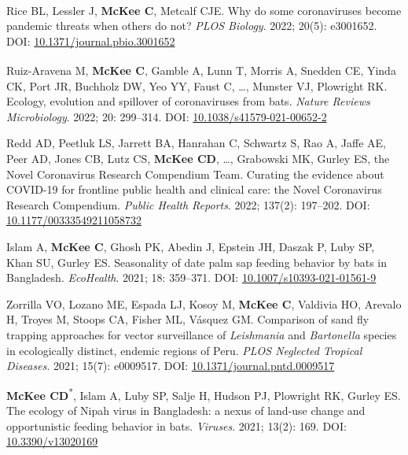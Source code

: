 \documentclass{cv}
\begin{document}
\begin{pubenum}
\item Rice BL\textsuperscript{\dag}, Lessler J\textsuperscript{\dag}, \textbf{McKee C}\textsuperscript{\dag}, Metcalf CJE\textsuperscript{\dag}. Why do some coronaviruses become pandemic threats when others do not? \textit{PLOS Biology}. 2022; 20(5): e3001652. DOI: \href{https://doi.org/10.1371/journal.pbio.3001652}{10.1371/journal.pbio.3001652}

\item Ruiz-Aravena M\textsuperscript{\dag}, \textbf{McKee C}\textsuperscript{\dag}, Gamble A, Lunn T, Morris A, Snedden CE, Yinda CK, Port JR, Buchholz DW, Yeo YY, Faust C, …, Munster VJ, Plowright RK. Ecology, evolution and spillover of coronaviruses from bats. \textit{Nature Reviews Microbiology}. 2022; 20: 299--314. DOI: \href{https://doi.org/10.1038/s41579-021-00652-2}{10.1038/s41579-021-00652-2}

\item Redd AD, Peetluk LS, Jarrett BA, Hanrahan C, Schwartz S, Rao A, Jaffe AE, Peer AD, Jones CB, Lutz CS, \textbf{McKee CD}, …, Grabowski MK, Gurley ES, the Novel Coronavirus Research Compendium Team. Curating the evidence about COVID-19 for frontline public health and clinical care: the Novel Coronavirus Research Compendium. \textit{Public Health Reports}. 2022; 137(2): 197--202. DOI: \href{https://doi.org/10.1177/00333549211058732}{10.1177/00333549211058732}

\item Islam A, \textbf{McKee C}, Ghosh PK, Abedin J, Epstein JH, Daszak P, Luby SP, Khan SU, Gurley ES. Seasonality of date palm sap feeding behavior by bats in Bangladesh. \textit{EcoHealth}. 2021; 18: 359--371. DOI: \href{https://doi.org/10.1007/s10393-021-01561-9}{10.1007/s10393-021-01561-9}

\item Zorrilla VO, Lozano ME, Espada LJ, Kosoy M, \textbf{McKee C}, Valdivia HO, Arevalo H, Troyes M, Stoops CA, Fisher ML, Vásquez GM. Comparison of sand fly trapping approaches for vector surveillance of \textit{Leishmania} and \textit{Bartonella} species in ecologically distinct, endemic regions of Peru. \textit{PLOS Neglected Tropical Diseases}. 2021; 15(7): e0009517. DOI: \href{https://doi.org/10.1371/journal.pntd.0009517}{10.1371/journal.pntd.0009517}

\item \textbf{McKee CD}\textsuperscript{*}, Islam A, Luby SP, Salje H, Hudson PJ, Plowright RK, Gurley ES. The ecology of Nipah virus in Bangladesh: a nexus of land-use change and opportunistic feeding behavior in bats. \textit{Viruses}. 2021; 13(2): 169. DOI: \href{https://doi.org/10.3390/v13020169}{10.3390/v13020169}


\end{pubenum}
\end{document}
